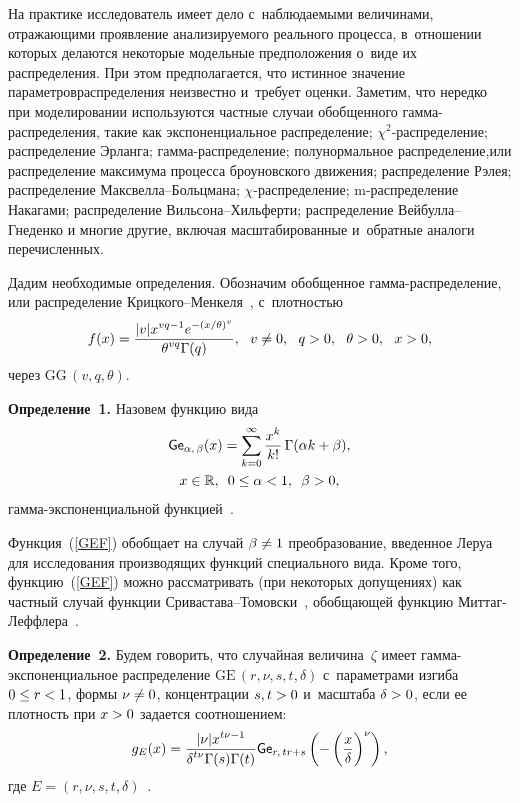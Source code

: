 \begin{multicols}{2}
На практике исследователь имеет дело с~наблюдаемыми величинами, отражающими 
про\-яв\-ление анализируемого реального процесса, в~отношении которых делаются 
некоторые модельные предположения о~виде их распределения. При этом 
пред\-полагается, что истинное значение параметров\linebreak распределения неизвестно 
и~требует оценки.
Заметим, что нередко при моделировании используются частные случаи обобщенного 
гам\-ма-рас\-пре\-де\-ле\-ния, такие как
экспоненциальное распределение;
$\chi^2$-рас\-пре\-де\-ле\-ние;
распределение Эрланга;
гам\-ма-рас\-пре\-де\-ле\-ние;
полунормальное распределение,\linebreak или
распределение максимума процесса броуновского движения;
распределение Рэлея;
распределение Макс\-вел\-ла--Больц\-ма\-на;
$\chi$-распределение;\linebreak
m-распределение Накагами;
распределение Виль\-со\-на--Хиль\-фер\-ти;
распределение Вей\-бул\-ла--Гне\-ден\-ко
и многие другие, включая масштабированные и~обратные аналоги перечисленных.

Дадим необходимые определения.
Обозначим обобщенное гам\-ма-рас\-пре\-де\-ле\-ние, или распределение 
Криц\-ко\-го--Мен\-ке\-ля~\cite{KrMe1946,KrMe1948}, с~плот\-ностью
$$
f(x)=\fr{|v| x^{vq -1}e^{-(x/\theta)^v}}{\theta^{vq}\Gamma(q)},\ \ v\neq0,\ 
\ q>0,\ \ \theta>0,\ \ x>0,
$$
через $\mathrm{GG}\,(v,q,\theta)$.

\smallskip

\noindent
\textbf{Определение~1.}
Назовем функцию вида
\begin{multline}
\label{GEF}
{\sf Ge}_{\alpha,\, \beta} (x) = \sum\limits_{k=0}^{\infty}\displaystyle\frac{\displaystyle x^k\mathstrut}{\displaystyle k!\mathstrut}\,
 \Gamma(\alpha k + 
\beta), \\
 x\in\mathbb{R}, \enskip 0\le\alpha<1, \enskip \beta> 0,
\end{multline}
гамма-экс\-по\-нен\-ци\-аль\-ной функцией~\cite{KuTi2017}.


Функция~(\ref{GEF}) обобщает на случай $\beta\hm\neq1$ преобразование, введенное 
Леруа~\cite{LeRoy1900_1} для исследования производящих функций специального 
вида. Кроме того, функцию~(\ref{GEF}) можно рас\-смат\-ри\-вать (при некоторых 
допущениях) как частный случай функции Сри\-ва\-ста\-ва--То\-мов\-ски~\cite{SrTo2009}, 
обобщающей функ\-цию Мит\-таг-Леф\-фле\-ра~\cite{GoKiMaRo2014}.

\smallskip

\noindent
\textbf{Определение~2.}
Будем говорить, что случайная величина~$\zeta$ имеет гам\-ма-экс\-по\-нен\-ци\-аль\-ное 
распределение $\mathrm{GE}\,(r,\nu,s,t,\delta)$ с~па\-ра\-мет\-ра\-ми изгиба $0\hm\le r\hm<1$, формы 
$\nu\hm\neq0$, концентрации $s,t\hm>0$ и~масштаба $\delta\hm>0$, если ее плотность при 
$x\hm>0$ задается соотношением:
$$
g_E(x) =
\displaystyle\frac{\displaystyle |\nu|x^{t\nu-1}\mathstrut}{\displaystyle \delta^{t\nu}\Gamma(s)\Gamma(t)\mathstrut}
   {\sf Ge}_{r,\, tr+s}\left(-\left(\displaystyle\frac{\displaystyle x\mathstrut}{\displaystyle \delta\mathstrut}\right)^{\nu}\right),
$$
где $E=(r,\nu,s,t,\delta)$~\cite{Ku2019_2}.


\end{multicols}
